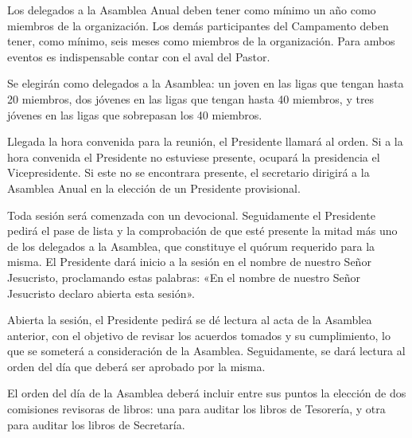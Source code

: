 


\article
\label{participacion-eventos}
Los delegados a la Asamblea Anual deben tener como mínimo un año como miembros de la organización. Los demás participantes del Campamento deben tener, como mínimo, seis meses como miembros de la organización. Para ambos eventos es indispensable contar con el aval del Pastor.

\article
\label{delegados-asamblea}
Se elegirán como delegados a la Asamblea: un joven en las ligas que tengan hasta 20 miembros, dos jóvenes en las ligas que tengan hasta 40 miembros, y tres jóvenes en las ligas que sobrepasan los 40 miembros.


\article
\label{eleccion-presidente-sustituto}
Llegada la hora convenida para la reunión, el Presidente llamará al orden. Si a la hora convenida el Presidente no estuviese presente, ocupará la presidencia el Vicepresidente. Si este no se encontrara presente, el secretario dirigirá a la Asamblea Anual en la elección de un Presidente provisional.

\article
Toda sesión será comenzada con un devocional. Seguidamente el Presidente pedirá el pase de lista y la comprobación de que esté presente la mitad más uno de los delegados a la Asamblea, que constituye el quórum requerido para la misma. El Presidente dará inicio a la sesión en el nombre de nuestro Señor Jesucristo, proclamando estas palabras: «En el nombre de nuestro Señor Jesucristo declaro abierta esta sesión».

\article
Abierta la sesión, el Presidente pedirá se dé lectura al acta de la Asamblea anterior, con el objetivo de revisar los acuerdos tomados y su cumplimiento, lo que se someterá a consideración de la Asamblea. Seguidamente, se dará lectura al orden del día que deberá ser aprobado por la misma.

\article
El orden del día de la Asamblea deberá incluir entre sus puntos la elección de dos comisiones revisoras de libros: una para auditar los libros de Tesorería, y otra para auditar los libros de Secretaría.


